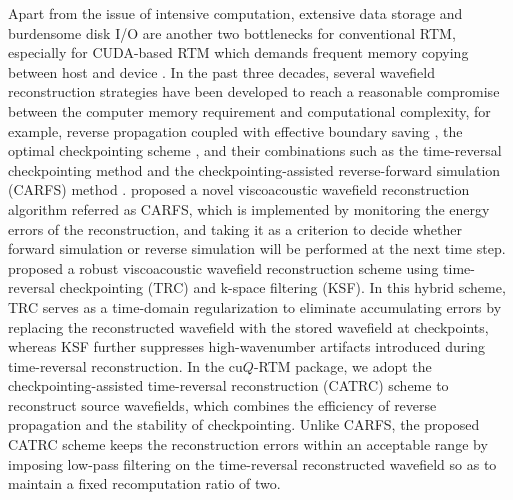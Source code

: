 Apart from the issue of intensive computation, extensive data storage and burdensome disk I/O are another two bottlenecks for conventional RTM, especially for CUDA-based RTM which demands frequent memory copying between host and device \citep{Liu20133D, Yang2014RTM}. In the past three decades, several wavefield reconstruction strategies have been developed to reach a reasonable compromise between the computer memory requirement and computational complexity, for example, reverse propagation coupled with effective boundary saving \citep{Yang2014RTM}, the optimal checkpointing scheme \citep{Griewank2000Algorithm, Symes2007Reverse}, and their combinations such as the time-reversal checkpointing method \citep{Anderson2012Time} and the checkpointing-assisted reverse-forward simulation (CARFS) method \citep{yang2016wavefield}. \cite{yang2016wavefield} proposed a novel viscoacoustic wavefield reconstruction algorithm referred as CARFS, which is implemented by monitoring the energy errors of the reconstruction, and taking it as a criterion to decide whether forward simulation or reverse simulation will be performed at the next time step. \cite{wang2017wavefield} proposed a robust viscoacoustic wavefield reconstruction scheme using time-reversal checkpointing (TRC) and k-space filtering (KSF). In this hybrid scheme, TRC serves as a time-domain regularization to eliminate accumulating errors by replacing the reconstructed wavefield with the stored wavefield at checkpoints, whereas KSF further suppresses high-wavenumber artifacts introduced during time-reversal reconstruction. In the cu$Q$-RTM package, we adopt the checkpointing-assisted time-reversal reconstruction (CATRC) scheme to reconstruct source wavefields, which combines the efficiency of reverse propagation and the stability of checkpointing. Unlike CARFS, the proposed CATRC scheme keeps the reconstruction errors within an acceptable range by imposing low-pass filtering on the time-reversal reconstructed wavefield so as to maintain a fixed recomputation ratio of two. 

